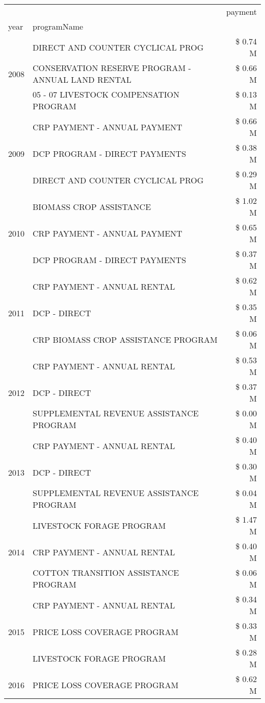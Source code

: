 \begin{tabular}{llr}
\toprule
 &  & payment \\
year & programName &  \\
\midrule
\multirow[t]{3}{*}{2008} & DIRECT AND COUNTER CYCLICAL PROG & \$ 0.74 M \\
 & CONSERVATION RESERVE PROGRAM - ANNUAL LAND RENTAL & \$ 0.66 M \\
 & 05 - 07 LIVESTOCK COMPENSATION PROGRAM & \$ 0.13 M \\
\cline{1-3}
\multirow[t]{3}{*}{2009} & CRP PAYMENT - ANNUAL PAYMENT & \$ 0.66 M \\
 & DCP PROGRAM - DIRECT PAYMENTS & \$ 0.38 M \\
 & DIRECT AND COUNTER CYCLICAL PROG & \$ 0.29 M \\
\cline{1-3}
\multirow[t]{3}{*}{2010} & BIOMASS CROP ASSISTANCE & \$ 1.02 M \\
 & CRP PAYMENT - ANNUAL PAYMENT & \$ 0.65 M \\
 & DCP PROGRAM - DIRECT PAYMENTS & \$ 0.37 M \\
\cline{1-3}
\multirow[t]{3}{*}{2011} & CRP PAYMENT - ANNUAL RENTAL & \$ 0.62 M \\
 & DCP - DIRECT & \$ 0.35 M \\
 & CRP BIOMASS CROP ASSISTANCE PROGRAM & \$ 0.06 M \\
\cline{1-3}
\multirow[t]{3}{*}{2012} & CRP PAYMENT - ANNUAL RENTAL & \$ 0.53 M \\
 & DCP - DIRECT & \$ 0.37 M \\
 & SUPPLEMENTAL REVENUE ASSISTANCE PROGRAM & \$ 0.00 M \\
\cline{1-3}
\multirow[t]{3}{*}{2013} & CRP PAYMENT - ANNUAL RENTAL & \$ 0.40 M \\
 & DCP - DIRECT & \$ 0.30 M \\
 & SUPPLEMENTAL REVENUE ASSISTANCE PROGRAM & \$ 0.04 M \\
\cline{1-3}
\multirow[t]{3}{*}{2014} & LIVESTOCK FORAGE PROGRAM & \$ 1.47 M \\
 & CRP PAYMENT - ANNUAL RENTAL & \$ 0.40 M \\
 & COTTON TRANSITION ASSISTANCE PROGRAM & \$ 0.06 M \\
\cline{1-3}
\multirow[t]{3}{*}{2015} & CRP PAYMENT - ANNUAL RENTAL & \$ 0.34 M \\
 & PRICE LOSS COVERAGE PROGRAM & \$ 0.33 M \\
 & LIVESTOCK FORAGE PROGRAM & \$ 0.28 M \\
\cline{1-3}
\multirow[t]{3}{*}{2016} & PRICE LOSS COVERAGE PROGRAM                   & \$ 0.62 M \\

\end{tabular}
